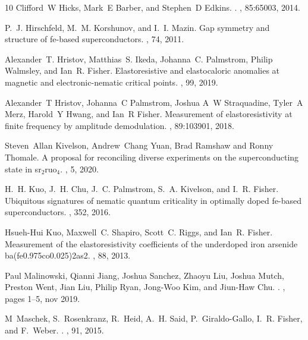 \documentclass[%
 reprint, %
amsmath,amssymb,
aps,
]{revtex4-2}
\begin{document}
\begin{thebibliography}{10}
Clifford~W Hicks, Mark~E Barber, and Stephen~D Edkins.
.
, 85:65003, 2014.

P.~J. Hirschfeld, M.~M. Korshunov, and I.~I. Mazin.
\newblock Gap symmetry and structure of fe-based superconductors.
, 74, 2011.

Alexander~T. Hristov, Matthias~S. Ikeda, Johanna~C. Palmstrom, Philip Walmsley,
  and Ian~R. Fisher.
\newblock Elastoresistive and elastocaloric anomalies at magnetic and
  electronic-nematic critical points.
, 99, 2019.

Alexander~T Hristov, Johanna~C Palmstrom, Joshua A~W Straquadine, Tyler~A Merz,
  Harold~Y Hwang, and Ian~R Fisher.
\newblock Measurement of elastoresistivity at finite frequency by amplitude
  demodulation.
, 89:103901, 2018.

Steven~Allan Kivelson, Andrew~Chang Yuan, Brad Ramshaw and Ronny Thomale.
\newblock A proposal for reconciling diverse experiments on the superconducting
  state in sr$_2$ruo$_4$.
, 5, 2020.

H.~H. Kuo, J.~H. Chu, J.~C. Palmstrom, S.~A. Kivelson, and I.~R. Fisher.
\newblock Ubiquitous signatures of nematic quantum criticality in optimally
  doped fe-based superconductors.
, 352, 2016.

Hsueh-Hui Kuo, Maxwell~C. Shapiro, Scott~C. Riggs, and Ian~R. Fisher.
\newblock Measurement of the elastoresistivity coefficients of the underdoped
  iron arsenide ba(fe0.975co0.025)2as2.
, 88, 2013.

Paul Malinowski, Qianni Jiang, Joshua Sanchez, Zhaoyu Liu, Joshua Mutch,
  Preston Went, Jian Liu, Philip Ryan, Jong-Woo Kim, and Jiun-Haw Chu.
.
, pages 1--5, nov 2019.

M~Maschek, S.~Rosenkranz, R.~Heid, A.~H. Said, P.~Giraldo-Gallo, I.~R. Fisher,
  and F.~Weber.
.
, 91, 2015.


\end{thebibliography}
\end{document}

